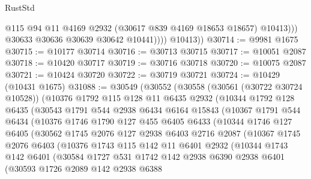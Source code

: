 \begin{lexlean}{RustStd}
\begin{coremodule}
                      @115
                      @94
                      @11
                      @4169
                      @2932
                      (@30617 @839 @4169 @18653 @18657)
                      @10413)))
                @30633
                @30636
                @30639
                @30642
                @10441))))
        @10413))
@30714 := @9981 @1675
@30715 := @10177 @30714
@30716 := @30713 @30715
@30717 := @10051 @2087
@30718 := @10420 @30717
@30719 := @30716 @30718
@30720 := @10075 @2087
@30721 := @10424 @30720
@30722 := @30719 @30721
@30724 := @10429 (@10431 @1675)
@31088 := @30549
    (@30552
      (@30558
        (@30561 (@30722 @30724 @10528))
        (@10376
          @1792
          @115
          @128
          @11
          @6435
          @2932
          (@10344
            @1792
            @128
            @6435
            (@30543
              @1791
              @544
              @2938
              @6434
              @6164
              @15843
              (@10367
                @1791
                @544
                @6434
                (@10376
                  @1746
                  @1790
                  @127
                  @455
                  @6405
                  @6433
                  (@10344
                    @1746
                    @127
                    @6405
                    (@30562
                      @1745
                      @2076
                      @127
                      @2938
                      @6403
                      @2716
                      @2087
                      (@10367
                        @1745
                        @2076
                        @6403
                        (@10376
                          @1743
                          @115
                          @142
                          @11
                          @6401
                          @2932
                          (@10344
                            @1743
                            @142
                            @6401
                            (@30584
                              @1727
                              @531
                              @1742
                              @142
                              @2938
                              @6390
                              @2938
                              @6401
                              (@30593
                                @1726
                                @2089
                                @142
                                @2938
                                @6388

\end{coremodule}
\end{lexlean}
